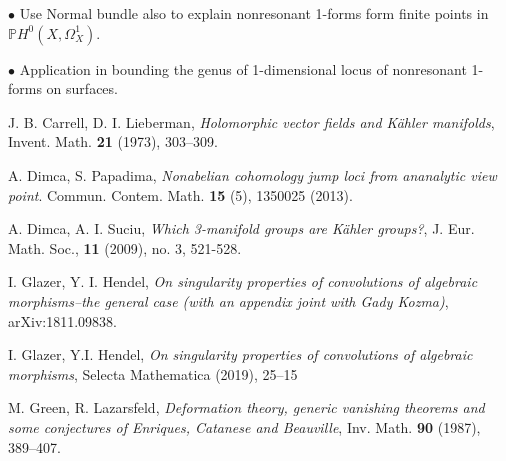 \documentclass[a4paper,12pt,reqno]{amsart}
\theoremstyle{plain}
\theoremstyle{remark}
\begin{document}
{\color{red} $\bullet$ Use Normal bundle also to explain nonresonant 1-forms form finite points in $\mathbb{P}H^0(X, \Omega_X^1)$.

$\bullet$ Application in bounding the genus of 1-dimensional locus of nonresonant  1-forms on surfaces.}




















\begin{thebibliography}{HKLR} 







 J. B. Carrell, D. I. Lieberman,  \textit{Holomorphic vector fields and K\"ahler manifolds}, Invent. Math. \textbf{21} (1973), 303--309.

A. Dimca, S. Papadima, \textit{Nonabelian cohomology jump loci from ananalytic view point}. Commun. Contem. Math. \textbf{15} (5), 1350025 (2013).


 A. Dimca, A. I. Suciu, \textit{Which 3-manifold groups are K\"ahler groups?}, J. Eur. Math. Soc., \textbf{11} (2009), no. 3, 521-528.

 I. Glazer, Y. I. Hendel, \textit{On singularity properties of convolutions of algebraic morphisms--the general case (with an appendix joint with Gady Kozma)}, arXiv:1811.09838.

  I. Glazer, Y.I. Hendel, \textit{On singularity properties of convolutions of algebraic morphisms}, Selecta Mathematica (2019), 25--15


 M. Green, R. Lazarsfeld, \textit{Deformation theory, generic vanishing theorems and some conjectures of Enriques, Catanese and Beauville}, Inv. Math. \textbf{90} (1987), 389--407.


\end{thebibliography}
\end{document}
